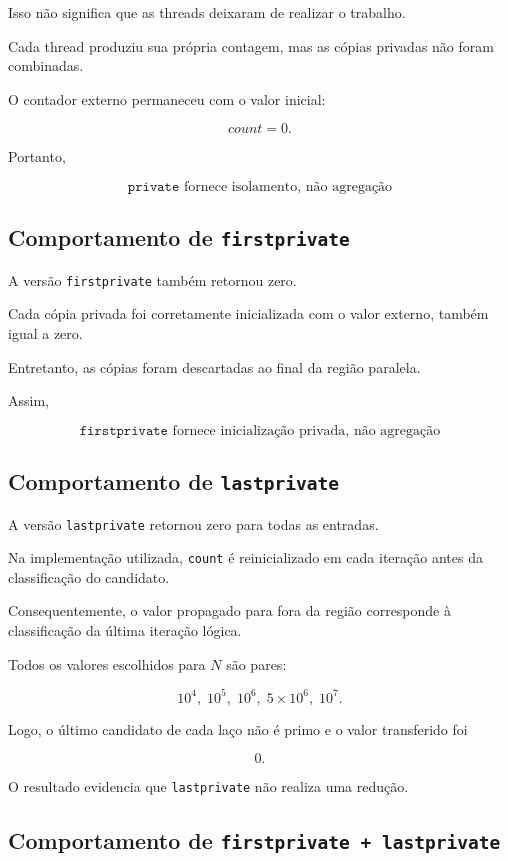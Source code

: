Isso não significa que as threads deixaram de realizar o trabalho.

Cada thread produziu sua própria contagem, mas as cópias privadas não foram
combinadas.

O contador externo permaneceu com o valor inicial:

\[
count=0.
\]

Portanto,

\[
\boxed{
\texttt{private}
\text{ fornece isolamento, não agregação}
}
\]


\subsection{Comportamento de \texttt{firstprivate}}

A versão \texttt{firstprivate} também retornou zero.

Cada cópia privada foi corretamente inicializada com o valor externo,
também igual a zero.

Entretanto, as cópias foram descartadas ao final da região paralela.

Assim,

\[
\boxed{
\texttt{firstprivate}
\text{ fornece inicialização privada, não agregação}
}
\]


\subsection{Comportamento de \texttt{lastprivate}}

A versão \texttt{lastprivate} retornou zero para todas as entradas.

Na implementação utilizada, \texttt{count} é reinicializado em cada
iteração antes da classificação do candidato.

Consequentemente, o valor propagado para fora da região corresponde à
classificação da última iteração lógica.

Todos os valores escolhidos para \(N\) são pares:

\[
10^4,\;
10^5,\;
10^6,\;
5\times10^6,\;
10^7.
\]

Logo, o último candidato de cada laço não é primo e o valor transferido foi

\[
0.
\]

O resultado evidencia que \texttt{lastprivate} não realiza uma redução.


\subsection{Comportamento de \texttt{firstprivate + lastprivate}}

